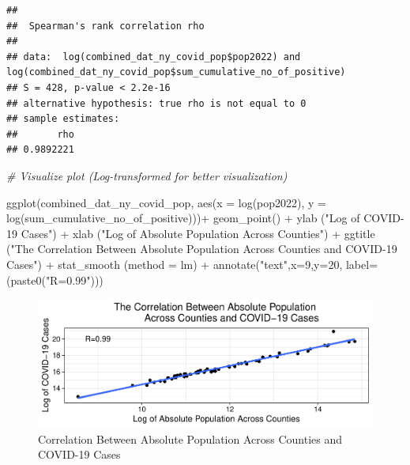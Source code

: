 \documentclass[
  12pt,
]{article}
\newenvironment{Shaded}{\begin{snugshade}}{\end{snugshade}}
\newcommand{\AttributeTok}[1]{\textcolor[rgb]{0.77,0.63,0.00}{#1}}
\newcommand{\CommentTok}[1]{\textcolor[rgb]{0.56,0.35,0.01}{\textit{#1}}}
\newcommand{\DecValTok}[1]{\textcolor[rgb]{0.00,0.00,0.81}{#1}}
\newcommand{\FunctionTok}[1]{\textcolor[rgb]{0.00,0.00,0.00}{#1}}
\newcommand{\NormalTok}[1]{#1}
\newcommand{\SpecialCharTok}[1]{\textcolor[rgb]{0.00,0.00,0.00}{#1}}
\newcommand{\StringTok}[1]{\textcolor[rgb]{0.31,0.60,0.02}{#1}}
\begin{document}
\begin{verbatim}
## 
##  Spearman's rank correlation rho
## 
## data:  log(combined_dat_ny_covid_pop$pop2022) and log(combined_dat_ny_covid_pop$sum_cumulative_no_of_positive)
## S = 428, p-value < 2.2e-16
## alternative hypothesis: true rho is not equal to 0
## sample estimates:
##       rho 
## 0.9892221
\end{verbatim}

\begin{Shaded}
\begin{Highlighting}[]
\CommentTok{\# Visualize plot (Log{-}transformed for better visualization)}

\FunctionTok{ggplot}\NormalTok{(combined\_dat\_ny\_covid\_pop, }\FunctionTok{aes}\NormalTok{(}\AttributeTok{x =} \FunctionTok{log}\NormalTok{(pop2022),}
                                      \AttributeTok{y =} \FunctionTok{log}\NormalTok{(sum\_cumulative\_no\_of\_positive)))}\SpecialCharTok{+}
  \FunctionTok{geom\_point}\NormalTok{() }\SpecialCharTok{+}
  \FunctionTok{ylab}\NormalTok{ (}\StringTok{"Log of COVID{-}19 Cases"}\NormalTok{) }\SpecialCharTok{+}
  \FunctionTok{xlab}\NormalTok{ (}\StringTok{"Log of Absolute Population Across Counties"}\NormalTok{) }\SpecialCharTok{+}
  \FunctionTok{ggtitle}\NormalTok{ (}\StringTok{"The Correlation Between Absolute Population }
\StringTok{           Across Counties and COVID{-}19 Cases"}\NormalTok{) }\SpecialCharTok{+}
  \FunctionTok{stat\_smooth}\NormalTok{ (}\AttributeTok{method =} \StringTok{\textquotesingle{}lm\textquotesingle{}}\NormalTok{) }\SpecialCharTok{+}
  \FunctionTok{annotate}\NormalTok{(}\StringTok{"text"}\NormalTok{,}\AttributeTok{x=}\DecValTok{9}\NormalTok{,}\AttributeTok{y=}\DecValTok{20}\NormalTok{, }\AttributeTok{label=}\NormalTok{(}\FunctionTok{paste0}\NormalTok{(}\StringTok{"R=0.99"}\NormalTok{)))}
\end{Highlighting}
\end{Shaded}

\begin{figure}
\centering
\includegraphics{EDA_Final_Group_Project_files/figure-latex/unnamed-chunk-21-1.pdf}
\caption{Correlation Between Absolute Population Across Counties and
COVID-19 Cases}
\end{figure}
\end{document}
